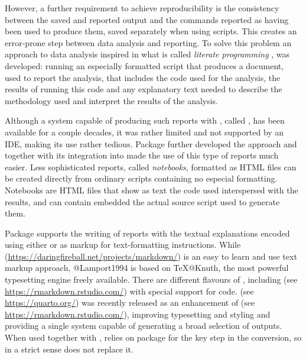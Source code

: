 \documentclass[krantz2]{krantz}\usepackage{knitr}
\begin{document}
However, a further requirement to achieve reproducibility is the consistency between the saved and reported output and the \Rlang commands reported as having been used to produce them, saved separately when using scripts. This creates an error-prone step between data analysis and reporting. To solve this problem an approach to data analysis inspired in what is called \emph{literate programming} \autocite{Knuth1984a}, was developed: running an especially formatted script that produces a document, used to report the analysis, that includes the \Rlang code used for the analysis, the results of running this code and any explanatory text needed to describe the methodology used and interpret the results of the analysis.

Although a system capable of producing such reports with \Rlang, called  \autocite{Leisch2002}, has been available for a couple decades, it was rather limited and not supported by an IDE, making its use rather tedious. Package  \autocite{Xie2013} further developed the approach and together with its integration into \RStudio made the use of this type of reports much easier. Less sophisticated reports, called \Rlang \emph{notebooks}, formatted as HTML files can be created directly from ordinary \Rlang scripts containing no especial formatting. Notebooks are HTML files that show as text the code used interspersed with the results, and can contain embedded the actual source script used to generate them.

Package  supports the writing of reports with the textual explanations encoded using either \Markdown or \Latex as markup for text-formatting instructions. While \Markdown (\url{https://daringfireball.net/projects/markdown/}) is an easy to learn and use text markup approach, \Latex @Lamport1994 is based on \TeX @Knuth, the most powerful typesetting engine freely available. There are different flavours of \Markdown, including \Rmarkdown (see \url{https://rmarkdown.rstudio.com/}) with special support for \Rlang code. \Quarto (see \url{https://quarto.org/}) was recently released as an enhancement of \Rmarkdown (see \url{https://rmarkdown.rstudio.com/}), improving typesetting and styling and providing a single system capable of generating a broad selection of outputs. When used together with \Rlang, \Quarto relies on package  for the key step in the conversion, so in a strict sense \Quarto does not replace it.
\end{document}
